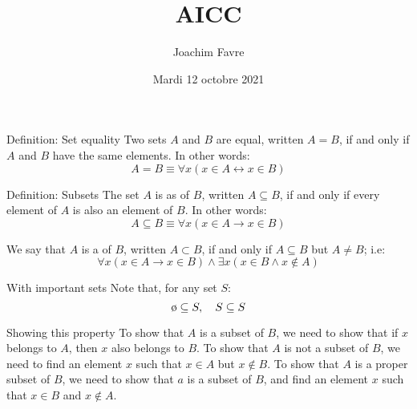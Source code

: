 \documentclass[a4paper]{article}
\title{AICC}
\author{Joachim Favre}
\date{Mardi 12 octobre 2021}
\begin{document}
\maketitle


\begin{parag}{Definition: Set equality}
    Two sets $A$ and $B$ are equal, written $A = B$, if and only if $A$ and $B$ have the same elements. In other words:
    \[A = B \equiv \forall x\left(x \in A \leftrightarrow x \in B\right)\]
\end{parag}

\begin{parag}{Definition: Subsets}
    The set $A$ is as  of $B$, written $A \subseteq B$, if and only if every element of $A$ is also an element of $B$. In other words:
    \[A \subseteq B \equiv \forall x\left(x \in A \to x \in B\right)\]

    We say that $A$ is a  of $B$, written $A \subset B$, if and only if $A \subseteq B$ but $A \neq B$; i.e:
    \[\forall x\left(x \in A \to x \in B\right) \land \exists x\left(x \in B \land x \not\in A\right)\]

    \begin{subparag}{With important sets}
        Note that, for any set $S$:
        \[\o \subseteq S, \mathspace S \subseteq S\]
    \end{subparag}

    \begin{subparag}{Showing this property}
        To show that $A$ is a subset of $B$, we need to show that if $x$ belongs to $A$, then $x$ also belongs to $B$. To show that $A$ is not a subset of $B$, we need to find an element $x$ such that $x \in A$ but $x \not\in B$. To show that $A$ is a proper subset of $B$, we need to show that $a$ is a subset of $B$, and find an element $x$ such that $x \in B$ and $x \not\in A$.
    \end{subparag}

\end{parag}
\end{document}
